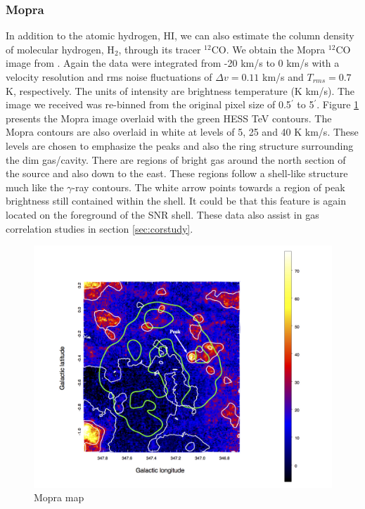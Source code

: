 \documentclass[12pt,a4paper]{article}
\begin{document}
\subsubsection{Mopra}
In addition to the atomic hydrogen, HI, we can also estimate the column density of molecular hydrogen, H$_2$, through its tracer $^{12}$CO. We obtain the Mopra $^{12}$CO image from \cite{2013PASA...30...44B}. Again the data were integrated from -20 km/s to 0 km/s with a velocity resolution and rms noise fluctuations of $\Delta v = 0.11$ km/s and $T_{rms} = 0.7$ K, respectively. The units of intensity are brightness temperature (K km/s). The image we received was re-binned from the original pixel size of 0.5$^\prime$ to 5$^{\prime}$. Figure \ref{fig:mopramap} presents the Mopra image overlaid with the green HESS TeV contours. The Mopra contours are also overlaid in white at levels of 5, 25 and 40 K km/s. These levels are chosen to emphasize the peaks and also the ring structure surrounding the dim gas/cavity. There are regions of bright gas around the north section of the source and also down to the east. These regions follow a shell-like structure much like the $\gamma$-ray contours. The white arrow points towards a region of peak brightness still contained within the shell. It could be that this feature is again located on the foreground of the SNR shell. These data also assist in gas correlation studies in section \ref{sec:corstudy}.
\begin{figure}[H]
	\centering
	\includegraphics[width=0.73\linewidth, height=0.35\textheight]{mopra_map}
	\caption{Mopra map}
	\label{fig:mopramap}
\end{figure}
\end{document}
